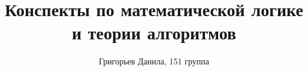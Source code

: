\documentclass{book}
\begin{document}
\title{Конспекты по математической логике и теории алгоритмов}
\author{Григорьев Данила, 151 группа}

\maketitle

\tableofcontents













\end{document}
